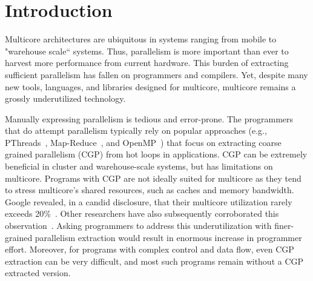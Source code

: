 \section{Introduction}



Multicore architectures are ubiquitous in systems ranging from mobile to
"warehouse scale`` systems. Thus, parallelism is more important than ever to
harvest more performance from current hardware.  This burden of extracting
sufficient parallelism has fallen on programmers and compilers. Yet, despite
many new tools, languages, and libraries designed for multicore, multicore
remains a grossly underutilized technology.



Manually expressing parallelism is tedious and error-prone. The programmers that
do attempt parallelism typically rely on popular approaches (e.g.,
PThreads~\cite{pthread:web}, Map-Reduce~\cite{dean:08:cacm}, and
OpenMP~\cite{openmp:web}) that focus on extracting coarse grained parallelism
(CGP) from hot loops in applications.
%
CGP can be extremely beneficial in cluster and warehouse-scale systems, but has
limitations on multicore.  Programs with CGP are not ideally suited for
multicore as they tend to stress multicore's shared resources, such as caches
and memory bandwidth.  Google revealed, in a candid disclosure, that their
multicore utilization rarely exceeds 20\%~\cite{barroso:07:computer}. Other
researchers have also subsequently corroborated this
observation~\cite{chung:13:isca}.
%
Asking programmers to address this underutilization with finer-grained
parallelism extraction would result in enormous increase in programmer effort.
%
Moreover, for programs with complex control and data flow, even CGP extraction
can be very difficult, and most such programs remain without a CGP extracted
version.

